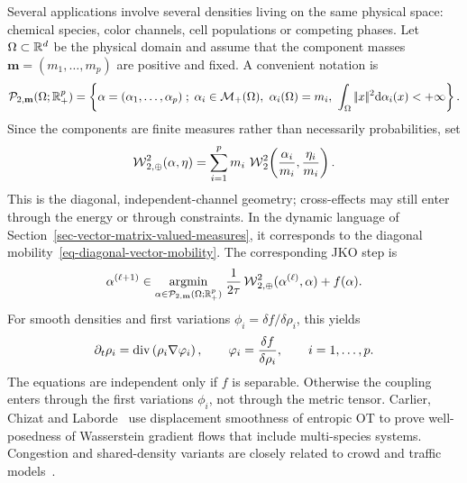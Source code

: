 Several applications involve several densities living on the same physical space: chemical species, color channels, cell populations or competing phases. Let $\Omega\subset\mathbb{R}^d$ be the physical domain and assume that the component masses $\mathbf m=(m_1,\ldots,m_p)$ are positive and fixed. A convenient notation is
\begin{equation}\label{eq-multispecies-space}
	\Pp_{2,\mathbf m}(\Omega;\RR_+^p)=
	\enscond{\alpha=(\alpha_1,\ldots,\alpha_p)}
	{\alpha_i\in\Mm_+(\Omega),\ \alpha_i(\Omega)=m_i,\ \int_\Omega\norm{x}^2\d\alpha_i(x)<+\infty}.
\end{equation}
Since the components are finite measures rather than necessarily probabilities, set
\begin{equation}\label{eq-multispecies-product-metric}
	\operatorname{\mathcal{W}}_{2,\oplus}^2(\alpha,\eta)=
	\sum_{i=1}^p m_i\,
	\operatorname{\mathcal{W}}_2^2\!\left(\frac{\alpha_i}{m_i},\frac{\eta_i}{m_i}\right).
\end{equation}
This is the diagonal, independent-channel geometry; cross-effects may still enter through the energy or through constraints. In the dynamic language of Section~\ref{sec-vector-matrix-valued-measures}, it corresponds to the diagonal mobility~\eqref{eq-diagonal-vector-mobility}. The corresponding JKO step is
\begin{equation}\label{eq-multispecies-jko}
	\alpha^{(\ell+1)}
	\in
	\underset{\alpha\in\mathcal{P}_{2,\mathbf m}(\Omega;\mathbb{R}_+^p)}{\operatorname{argmin}}\;
		\frac{1}{2\tau}\operatorname{\mathcal{W}}_{2,\oplus}^2(\alpha^{(\ell)},\alpha)+f(\alpha).
\end{equation}
For smooth densities and first variations $\phi_i=\delta f/\delta\rho_i$, this yields
\begin{equation}\label{eq-multispecies-pde}
	\partial_t\rho_i=\operatorname{div}\left(\rho_i\nabla\varphi_i\right),
	\qquad
		\varphi_i=\frac{\delta f}{\delta\rho_i},
	\qquad i=1,\ldots,p.
\end{equation}
The equations are independent only if $f$ is separable. Otherwise the coupling enters through the first variations $\phi_i$, not through the metric tensor. Carlier, Chizat and Laborde~\cite{CarlierChizatLabordeDisplacementSmoothness} use displacement smoothness of entropic OT to prove well-posedness of Wasserstein gradient flows that include multi-species systems. Congestion and shared-density variants are closely related to crowd and traffic models~\cite{maury2010macroscopic,CarlierSantambrogioOTCongestion2008,SantambrogioCrowdReview}.

